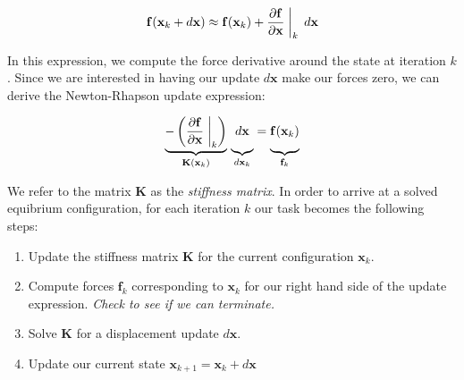 \documentclass[12pt,oneside,letterpaper]{memoir}
\begin{document}
\begin{equation}
  \mathbf f(\mathbf x_k + d\mathbf x) \approx \mathbf f(\mathbf x_k) +
  \frac{\partial \mathbf{f}}{\partial \mathbf x}\biggm|_k\,d\mathbf x
\end{equation}

In this expression, we compute the force derivative around the state
at iteration $k$. Since we are interested in having our update
$d\mathbf x$ make our forces zero, we can derive the Newton-Rhapson
update expression:

\begin{equation}
  \label{equ:newtonstep}
  \underbrace{- \left(\frac{\partial \mathbf{f}}{\partial \mathbf
      x}\biggm|_k\right)}_{\mathbf K(\mathbf x_k)}
\,\underbrace{\vphantom{- \left(\frac{\partial \mathbf{f}}{\partial \mathbf
      x}\biggm|_k\right)}d\mathbf x}_{d\mathbf x_k}
  = \underbrace{\vphantom{- \left(\frac{\partial \mathbf{f}}{\partial \mathbf
      x}\biggm|_k\right)}\mathbf f(\mathbf x_k)}_{\mathbf f_k}
\end{equation}

We refer to the matrix $\mathbf K$ as the \textit{stiffness
  matrix}. In order to arrive at a solved equibrium configuration, for
each iteration $k$ our task becomes the following steps:

\begin{enumerate}
  \item Update the stiffness matrix $\mathbf K$ for the current
    configuration $\mathbf x_k$.
  \item Compute forces $\mathbf f_k$ corresponding to $\mathbf x_k$
    for our right hand side of the update expression. \textit{Check to
      see if we can terminate.}
  \item Solve $\mathbf K$ for a displacement update $d\mathbf x$.
  \item Update our current state $\mathbf x_{k+1} = \mathbf x_k +
    d\mathbf x$
  \end{enumerate}
\end{document}
